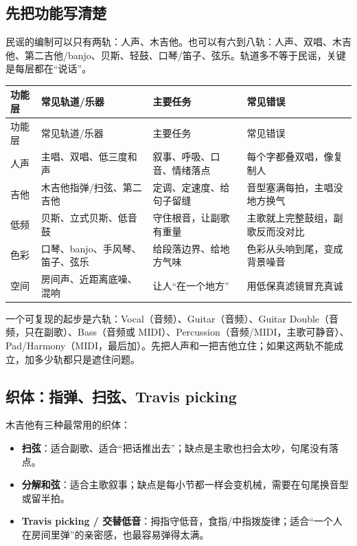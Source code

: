 \subsection{先把功能写清楚}
\label{sec:folk-instrumentation}

民谣的编制可以只有两轨：人声、木吉他。也可以有六到八轨：人声、双唱、木吉他、第二吉他/banjo、贝斯、轻鼓、口琴/笛子、弦乐。轨道多不等于民谣，关键是每层都在“说话”。

\begin{longtable}{p{}p{}p{}p{}}
\toprule
功能层 & 常见轨道/乐器 & 主要任务 & 常见错误 \\
\midrule
\endfirsthead
\toprule
功能层 & 常见轨道/乐器 & 主要任务 & 常见错误 \\
\midrule
\endhead
人声 & 主唱、双唱、低三度和声 & 叙事、呼吸、口音、情绪落点 & 每个字都叠双唱，像复制人 \\
吉他 & 木吉他指弹/扫弦、第二吉他 & 定调、定速度、给句子留缝 & 音型塞满每拍，主唱没地方换气 \\
低频 & 贝斯、立式贝斯、低音鼓 & 守住根音，让副歌有重量 & 主歌就上完整鼓组，副歌反而没对比 \\
色彩 & 口琴、banjo、手风琴、笛子、弦乐 & 给段落边界、给地方气味 & 色彩从头响到尾，变成背景噪音 \\
空间 & 房间声、近距离底噪、混响 & 让人“在一个地方” & 用低保真滤镜冒充真诚 \\
\bottomrule
\end{longtable}

一个可复现的起步是六轨：Vocal（音频）、Guitar（音频）、Guitar Double（音频，只在副歌）、Bass（音频或 MIDI）、Percussion（音频/MIDI，主歌可静音）、Pad/Harmony（MIDI，最后加）。先把人声和一把吉他立住；如果这两轨不能成立，加多少轨都只是遮住问题。

\subsection{织体：指弹、扫弦、Travis picking}
\label{sec:folk-texture}

木吉他有三种最常用的织体：

\begin{itemize}
\item \textbf{扫弦}：适合副歌、适合“把话推出去”；缺点是主歌也扫会太吵，句尾没有落点。
\item \textbf{分解和弦}：适合主歌叙事；缺点是每小节都一样会变机械，需要在句尾换音型或留半拍。
\item \textbf{Travis picking / 交替低音}：拇指守低音，食指/中指拨旋律；适合“一个人在房间里弹”的亲密感，也最容易弹得太满。
\end{itemize}

